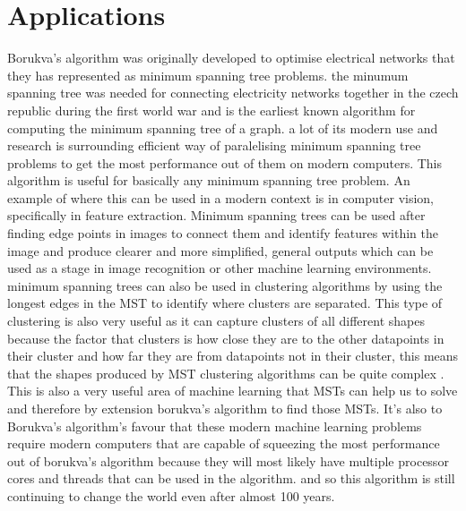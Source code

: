 \documentclass{report}
\begin{document}
\section{Applications}
Borukva's algorithm was originally developed to optimise electrical networks that they has represented as minimum spanning tree problems. the minumum spanning tree was needed for connecting electricity networks together in the czech republic during the first world war and is the earliest known algorithm for computing the minimum spanning tree of a graph. a lot of its modern use and research is surrounding efficient way of paralelising minimum spanning tree problems to get the most performance out of them on modern computers.
This algorithm is useful for basically any minimum spanning tree problem. An example of where this can be used in a modern context is in computer vision, specifically in feature extraction. Minimum spanning trees can be used after finding edge points in images to connect them and identify features within the image and produce clearer and more simplified, general outputs \cite{SUK1984400} which can be used as a stage in image recognition or other machine learning environments.
minimum spanning trees can also be used in clustering algorithms by using the longest edges in the MST to identify where clusters are separated. This type of clustering is also very useful as it can capture clusters of all different shapes because the factor that clusters is how close they are to the other datapoints in their cluster and how far they are from datapoints not in their cluster, this means that the shapes produced by MST clustering algorithms can be quite complex \cite{5397966}. This is also a very useful area of machine learning that MSTs can help us to solve and therefore by extension borukva's algorithm to find those MSTs. It's also to Borukva's algorithm's favour that these modern machine learning problems require modern computers that are capable of squeezing the most performance out of borukva's algorithm because they will most likely have multiple processor cores and threads that can be used in the algorithm. and so this algorithm is still continuing to change the world even after almost 100 years.




\end{document}
